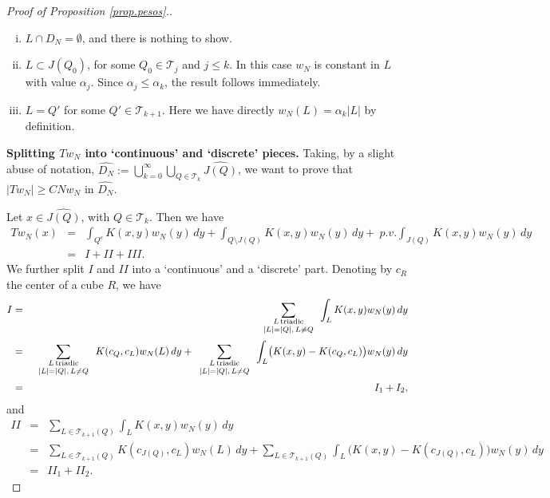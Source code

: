 \documentclass[11pt]{amsart}
\theoremstyle{definition}
\begin{document}
\begin{proof}[Proof of Proposition \ref{prop.pesos}.]
\begin{enumerate}[i)]
\item $L \cap D_N=\emptyset$, and there is nothing to show.

\item $L\subset J(Q_0)$, for some $Q_0 \in \mathcal T_j$ and $j\le k$. In this case $w_N$ is constant in $L$ with value $\alpha_j$. Since $\alpha_j\leq \alpha_k$, the result follows immediately. 

\item $L=Q'$ for some $Q' \in \mathcal T_{k+1}$. Here we have directly $w_N(L) =\alpha_k |L|$ by definition. 
\end{enumerate}

\bigskip

\textbf{Splitting $T w_N$ into `continuous' and `discrete' pieces.} Taking, by a slight abuse of notation, $\widehat{D_N}:=\bigcup_{k=0}^\infty \bigcup_{Q\in\mathcal T_{k}} \widehat{J(Q)}$, we want to prove that $|T w_N|\geq CN w_N$ in $\widehat{D_N}$. 

\bigskip

Let $x\in \widehat{J(Q)}$, with $Q\in \mathcal T_{k}$.  Then we have
\begin{eqnarray*}
T w_N(x) &=& \int_{Q^c}\! K(x,y)w_N(y)\,dy+ \int_{Q\setminus J(Q)}\!K(x,y)w_N(y)\,dy +\  p.v.\int_{J(Q)}\! K(x,y)w_N(y)\,dy\\
&=& I+ I\!I+ I\!I\!I.
\end{eqnarray*}
We further split $I$ and $I\!I$ into a `continuous' and a `discrete' part. Denoting by $c_R$ the center of a cube $R$, we have
\begin{eqnarray*}
I &=& \sum_{\begin{array}{c}\\[-6mm]\scriptstyle{L \, 	\rm{triadic} }\\[-1.5mm] \scriptstyle{|L|=|Q|, \, L\neq Q}\end{array}} \int_L K(x,y)w_N(y)\,dy 
\\&=& \sum_{\begin{array}{c}\\[-6mm]\scriptstyle{L \, 	\rm{triadic} }\\[-1.5mm] \scriptstyle{|L|=|Q|, \, L\neq Q}\end{array}} K(c_Q,c_L)w_N(L)\,dy+
\sum_{\begin{array}{c}\\[-6mm]\scriptstyle{L \, 	\rm{triadic} }\\[-1.5mm] \scriptstyle{|L|=|Q|, \, L\neq Q}\end{array}}\int_L \bigl(K(x,y)-K(c_Q,c_L)\bigr)w_N(y)\,dy\\&=&
I_1+I_2,
\end{eqnarray*}
and
\begin{eqnarray*}
I\!I &=& \sum_{L\in\mathcal T_{k+1}(Q)} \int_L K(x,y)w_N(y)\,dy 
\\&=& \sum_{L\in\mathcal T_{k+1}(Q)} K(c_{J(Q)},c_L)w_N(L)\,dy+\sum_{L\in\mathcal T_{k+1}(Q)} \int_L \bigl(K(x,y)-K(c_{J(Q)},c_L)\bigr)w_N(y)\,dy\\&=&
I\!I_1+I\!I_2.
\end{eqnarray*}


\end{proof}
\end{document}
